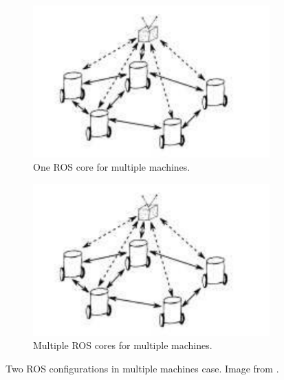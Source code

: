 \documentclass[11pt,openany]{book}
\begin{document}
\begin{figure}[H]
    \centering
    \begin{subfigure}[H]{0.4\linewidth}
        \includegraphics[width=\linewidth]{assets/4_8_a.png}
        \caption{{One ROS core for multiple machines.}}
        \label{fig:4.8a}
    \end{subfigure}
    \begin{subfigure}[H]{0.4\linewidth}
        \includegraphics[width=\linewidth]{assets/4_8_a.png}
        \caption{{Multiple ROS cores for multiple machines.}}
        \label{fig:4.8b}
    \end{subfigure}
    \caption{{Two ROS conﬁgurations in multiple machines case. Image from \cite{andre2014coordinated}.}}
    \label{fig:4.8}
\end{figure}
\end{document}
